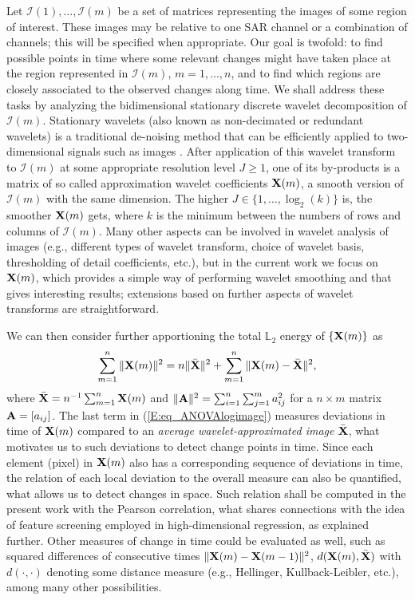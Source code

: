 \documentclass[journal]{IEEEtran}
\newcommand{\vA}{{\textbf A}}
\newcommand{\vX}{{\textbf X}}
\begin{document}
Let $\mathcal{I}(1),\ldots,\mathcal{I}(m)$ be a set of matrices representing the images of some region of interest. These images may be relative to one SAR channel or a combination of channels; this will be specified when appropriate. Our goal is twofold: to find possible points in time where some relevant changes might have taken place at the region represented in $\mathcal{I}(m)$, $m=1,\ldots,n$, and to find which regions are closely associated to the observed changes along time. We shall address these tasks by analyzing the bidimensional stationary discrete wavelet decomposition of $\mathcal{I}(m)$. Stationary wavelets (also known as non-decimated or redundant wavelets) is a traditional de-noising method that can be efficiently applied to two-dimensional signals such as images \cite{coifman1995translation,atto2012multidate,atto2016wavelet}. After application of this wavelet transform to $\mathcal{I}(m)$ at some appropriate resolution level $J\geq 1$, one of its by-products is a matrix of so called approximation wavelet coefficients $\vX(m)$, a smooth version of $\mathcal{I}(m)$ with the same dimension. The higher $J\in\{1,\ldots,\log_2(k)\}$ is, the smoother $\vX(m)$ gets, where $k$ is the minimum between the numbers of rows and columns of $\mathcal{I}(m)$. Many other aspects can be involved in wavelet analysis of images (e.g., different types of wavelet transform, choice of wavelet basis, thresholding of detail coefficients, etc.), but in the current work we focus on $\vX(m)$, which provides a simple way of performing wavelet smoothing and that gives interesting results; extensions based on further aspects of wavelet transforms are straightforward.

We can then consider further apportioning the total $\mathbb{L}_2$ energy of $\left\{\vX(m)\right\}$ as
\begin{equation} 
\sum_{m=1}^n\|\vX(m)\|^2=n\|\bar{\vX}\|^2+\sum_{m=1}^n\|\mathcal \vX(m)-\bar{\vX}\|^2,\label{E:eq_ANOVAlogimage}
\end{equation}
where $\bar{\vX}=n^{-1}\sum_{m=1}^n\vX(m)$ and $\|\vA\|^2=\sum_{i=1}^n\sum_{j=1}^m a_{ij}^2$ for a $n\times m$ matrix $\vA=[a_{ij}]$. The last term in (\ref{E:eq_ANOVAlogimage}) measures deviations in time of $\vX(m)$ compared to an {\it average wavelet-approximated image} $\bar{\vX}$, what motivates us to such deviations to detect change points in time. Since each element (pixel) in $\vX(m)$ also has a corresponding sequence of deviations in time, the relation of each local deviation to the overall measure can also be quantified, what allows us to detect changes in space. Such relation shall be computed in the present work with the Pearson correlation, what shares connections with the idea of feature screening employed in high-dimensional regression, as explained further. Other measures of change in time could be evaluated as well, such as squared differences of consecutive times $\|\mathcal \vX(m)-\vX(m-1)\|^2$, $d(\vX(m),\bar{\vX})$ with $d(\cdot,\cdot)$ denoting some distance measure (e.g., Hellinger, Kullback-Leibler, etc.), among many other possibilities.
\end{document}
